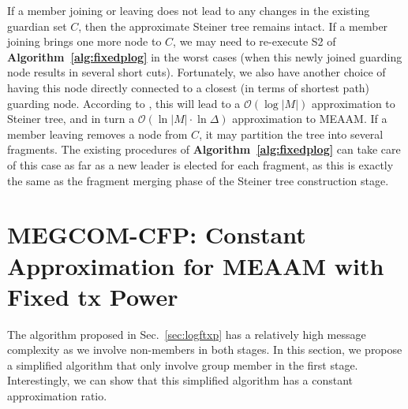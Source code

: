 \documentclass[10pt, conference, compsocconf]{IEEEtran}
\begin{document}
    If a member joining or leaving does not lead to any changes in the existing guardian set $C$, then the approximate Steiner tree remains intact. If a member joining brings one more node to $C$, we may need to re-execute S2 of \textbf{Algorithm~\ref{alg:fixedplog}} in the worst cases (when this newly joined guarding node results in several short cuts). Fortunately, we also have another choice of having this node directly connected to a closest (in terms of shortest path) guarding node. According to \cite{ImaseW91}, this will lead to a $\mathcal{O}(\log|M|)$ approximation to Steiner tree, and in turn a $\mathcal{O}(\ln|M| \cdot \ln\Delta)$ approximation to MEAAM. If a member leaving removes a node from $C$, it may partition the tree into several fragments. The existing procedures of \textbf{Algorithm~\ref{alg:fixedplog}} can take care of this case as far as a new leader is elected for each fragment, as this is exactly the same as the fragment merging phase of the Steiner tree construction stage.

\section{MEGCOM-CFP: Constant Approximation for MEAAM with Fixed tx Power} \label{sec:conftxp}
The algorithm proposed in Sec.~\ref{sec:logftxp} has a relatively high message complexity as we involve non-members in both stages. In this section, we propose a simplified algorithm that only involve group member in the first stage. Interestingly, we can show that this simplified algorithm has a constant approximation ratio.
\end{document}
